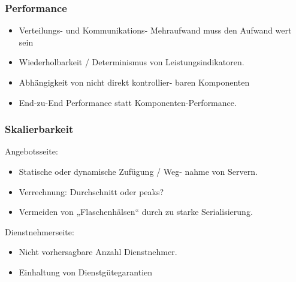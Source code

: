 \documentclass[a4paper, 10pt]{article}
\begin{document}
\subsubsection{Performance}
\begin{itemize}
	\item Verteilungs- und Kommunikations- Mehraufwand muss den Aufwand wert sein
	\item Wiederholbarkeit / Determinismus von Leistungsindikatoren.
	\item Abhängigkeit von nicht direkt kontrollier- baren Komponenten
	\item End-zu-End Performance statt Komponenten-Performance.
\end{itemize}

\subsubsection{Skalierbarkeit}
Angebotsseite:
\begin{itemize}
	\item Statische oder dynamische Zufügung / Weg- nahme von Servern.
	\item Verrechnung: Durchschnitt oder peaks?
	\item Vermeiden von „Flaschenhälsen“ durch zu starke Serialisierung.
\end{itemize}
Dienstnehmerseite:
\begin{itemize}
	\item Nicht vorhersagbare Anzahl Dienstnehmer.
	\item Einhaltung von Dienstgütegarantien
\end{itemize}
\end{document}
